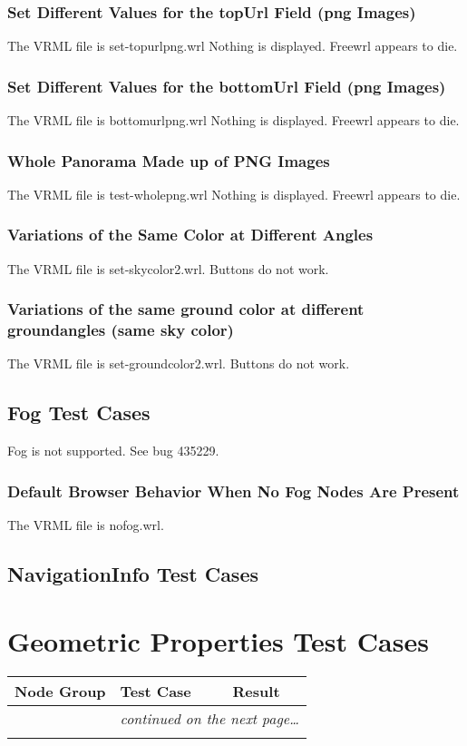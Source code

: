 \documentclass[12pt,letterpaper]{article}
\newcounter{testCaseCtr}
\newcommand{\resetTestCase}{\setcounter{testCaseCtr}{1}}
\newcommand{\BkgS}{Set Different Values for the topUrl Field (png Images)}
\newcommand{\BkgT}{Set Different Values for the bottomUrl Field (png Images)}
\newcommand{\BkgU}{Whole Panorama Made up of PNG Images}
\newcommand{\BkgV}{Variations of the Same Color at Different Angles}
\newcommand{\BkgWa}{Variations of the same ground color at different ground}
\newcommand{\BkgWb}{angles (same sky color)}
\newcommand{\FogA}{Default Browser Behavior When No Fog Nodes Are Present}
\begin{document}
\subsubsection{\BkgS}
The VRML file is set-topurlpng.wrl
Nothing is displayed. Freewrl appears to die.

\subsubsection{\BkgT}
The VRML file is bottomurlpng.wrl
Nothing is displayed. Freewrl appears to die.

\subsubsection{\BkgU}
The VRML file is test-wholepng.wrl
Nothing is displayed. Freewrl appears to die.

\subsubsection{\BkgV}
The VRML file is set-skycolor2.wrl.
Buttons do not work.

\subsubsection{\BkgWa\BkgWb}
The VRML file is set-groundcolor2.wrl.
Buttons do not work.





\subsection{Fog Test Cases}
Fog is not supported.
See bug 435229.

\subsubsection{\FogA}
The VRML file is nofog.wrl.

\subsection{NavigationInfo Test Cases}
\section{Geometric Properties Test Cases}
\resetTestCase

\begin{center}
\setlongtables
\begin{longtable}{|l|l|l|}
\hline
\textbf{Node Group} & \textbf{Test Case} & \textbf{Result} \\
\hline\hline
\endhead
 & \multicolumn{2}{|r|}{\textsl{continued on the next page\ldots}} \\
\hline
\endfoot
\hline
\endlastfoot
& & \\
\cline{2-3}
\end{longtable}
\end{center}
\end{document}
